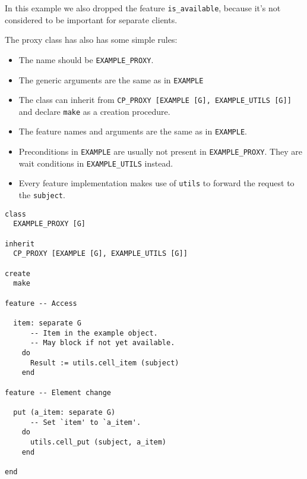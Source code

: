 In this example we also dropped the feature \lstinline!is_available!, because it's not considered to be important for separate clients.

The proxy class has also has some simple rules:

 \begin{itemize}
  \item The name should be \lstinline!EXAMPLE_PROXY!.
  \item The generic arguments are the same as in \lstinline!EXAMPLE!
  \item The class can inherit from \lstinline!CP_PROXY [EXAMPLE [G], EXAMPLE_UTILS [G]]! and declare \lstinline!make! as a creation procedure.
  \item The feature names and arguments are the same as in \lstinline!EXAMPLE!.
  \item Preconditions in \lstinline!EXAMPLE! are usually not present in \lstinline!EXAMPLE_PROXY!. They are wait conditions in \lstinline!EXAMPLE_UTILS! instead.
  \item Every feature implementation makes use of \lstinline!utils! to forward the request to the \lstinline!subject!.
 \end{itemize}

\begin{lstlisting}
class
  EXAMPLE_PROXY [G]

inherit
  CP_PROXY [EXAMPLE [G], EXAMPLE_UTILS [G]]

create
  make
  
feature -- Access

  item: separate G
      -- Item in the example object.
      -- May block if not yet available.
    do
      Result := utils.cell_item (subject)
    end

feature -- Element change

  put (a_item: separate G)
      -- Set `item' to `a_item'.
    do
      utils.cell_put (subject, a_item)
    end

end
\end{lstlisting}

